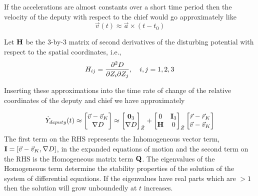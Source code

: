 If the accelerations are almost constants over a short time period then the velocity of the deputy with respect to the chief would go approximately like
$$\vec{v}(t) \approx \vec{a} \times (t-t_0)$$

Let $\bf H$ be the 3-by-3 matrix of second derivatives of the disturbing potential with respect to the spatial coordinates, i.e., 
$$H_{ij} = {\partial^2 D\over \partial Z_i \partial Z_j}, \quad i,j = 1,2,3$$

Inserting these approximations into the time rate of change of the relative coordinates of the deputy and chief we have approximately

$$\dot Y_{deputy}(t) \approx 
\begin{bmatrix}
{\vec v} - {\vec v}_K\\
{\bf \nabla} D\\
\end{bmatrix} \approx 
\begin{bmatrix}
{\bf 0}_3\\
{\bf \nabla} D\\
\end{bmatrix}_{\hat Z}  + 
\begin{bmatrix}
 0         &  {\bf I}_3\\
{\bf H}  &0\\
\end{bmatrix}_{\hat Z} 
\begin{bmatrix}
 \vec{r}- \vec{r}_K\\
\vec{v} - \vec{v}_K\\
\end{bmatrix} 
$$
The first term on the RHS represents the Inhomogeneous vector term, ${\bf I} = [{\vec v} - {\vec v}_K, {\bf \nabla} D]$, in the expanded equations of motion and the second term on the RHS is the Homogeneous matrix term $\bf Q$. The eigenvalues of the Homogeneous term determine the stability properties of the solution of the system of differential equations. If the eigenvalues have real parts which are $>1$ then the solution will grow unboundedly at $t$ increases. \\
